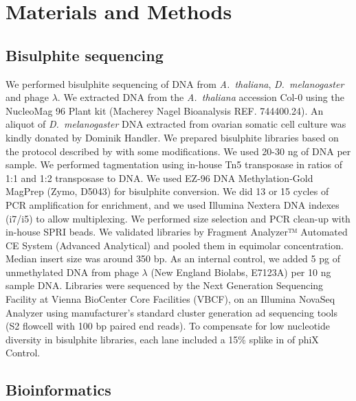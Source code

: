 \documentclass[twocolumn,twoside,lettersize]{article}
\begin{document}
\section{Materials and Methods}

\subsection{Bisulphite sequencing}

We performed bisulphite sequencing of DNA from \textit{A.~thaliana}, \emph{D.~melanogaster} and phage $\lambda$.
We extracted DNA from the \textit{A.~thaliana} accession Col-0 using the NucleoMag 96 Plant kit (Macherey Nagel Bioanalysis REF. 744400.24).
An aliquot of \textit{D.~melanogaster} DNA extracted from ovarian somatic cell culture \cite{niki2006establishment, saito2009regulatory} was kindly donated by Dominik Handler.
We prepared bisulphite libraries based on the protocol described by \textcite{weichenhan2019generation} with some modifications.
We used 20-30 ng of DNA per sample.
We performed tagmentation using in-house Tn5 transposase in ratios of 1:1 and 1:2 transposase to DNA.
We used EZ-96 DNA Methylation-Gold MagPrep (Zymo, D5043) for bisulphite conversion.
We did 13 or 15 cycles of PCR amplification for enrichment, and we used Illumina Nextera DNA indexes (i7/i5) to allow multiplexing.
We performed size selection and PCR clean-up with in-house SPRI beads.
We validated libraries by Fragment Analyzer™ Automated CE System (Advanced Analytical) and pooled them in equimolar concentration.
Median insert size was around 350 bp.
As an internal control, we added 5 pg of unmethylated DNA from phage $\lambda$ (New England Biolabs, E7123A) per 10 ng sample DNA. 
Libraries were sequenced by the Next Generation Sequencing Facility at Vienna BioCenter Core Facilities (VBCF), on an Illumina NovaSeq Analyzer using manufacturer’s standard cluster generation ad sequencing tools (S2 flowcell with 100 bp paired end reads).
To compensate for low nucleotide diversity in bisulphite libraries, each lane included a 15\% splike in of phiX Control.

\subsection{Bioinformatics}
\end{document}
